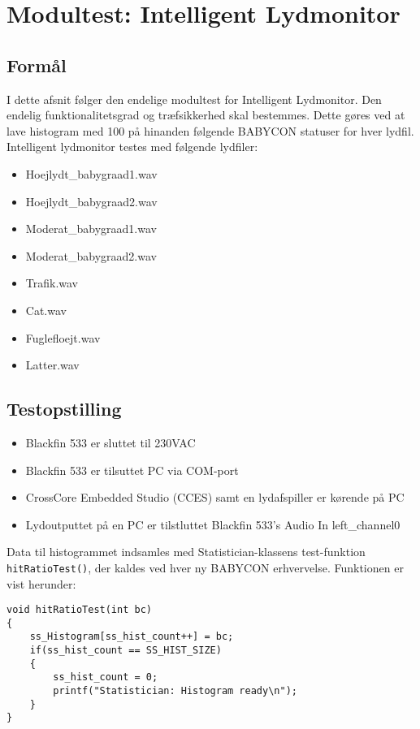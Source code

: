 \section{Modultest: Intelligent Lydmonitor}

\subsection{Formål}
I dette afsnit følger den endelige modultest for Intelligent Lydmonitor. Den endelig funktionalitetsgrad og træfsikkerhed skal bestemmes. Dette gøres ved at lave histogram med 100 på hinanden følgende BABYCON statuser for hver lydfil. Intelligent lydmonitor testes med følgende lydfiler:
\begin{itemize}
	\item Hoejlydt\_babygraad1.wav
	\item Hoejlydt\_babygraad2.wav
	\item Moderat\_babygraad1.wav
	\item Moderat\_babygraad2.wav
	\item Trafik.wav
	\item Cat.wav
	\item Fuglefloejt.wav
	\item Latter.wav
\end{itemize}

\subsection{Testopstilling}
\begin{itemize}
	\item Blackfin 533 er sluttet til 230VAC
	\item Blackfin 533 er tilsuttet PC via COM-port
	\item CrossCore Embedded Studio (CCES) samt en lydafspiller er kørende på PC
	\item Lydoutputtet på en PC er tilstluttet Blackfin 533's Audio In left\_channel0
\end{itemize}

Data til histogrammet indsamles med Statistician-klassens test-funktion \verb+hitRatioTest()+, der kaldes ved hver ny BABYCON erhvervelse. Funktionen er vist herunder:
\begin{verbatim}void hitRatioTest(int bc)
{
    ss_Histogram[ss_hist_count++] = bc;
    if(ss_hist_count == SS_HIST_SIZE)
    {
        ss_hist_count = 0;
        printf("Statistician: Histogram ready\n");
    }
}
\end{verbatim}

